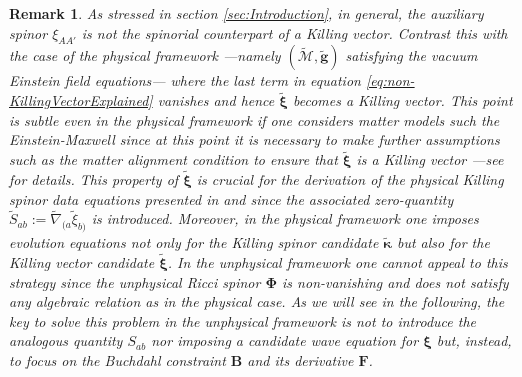 \documentclass[10pt,a4paper]{article}
\theoremstyle{plain}
\newtheorem{remark}{Remark}
\def\bmg{{\bm g}}
\def\bmB{{\bm B}}
\def\bmF{{\bm F}}
\begin{document}
\begin{remark}
  \emph{ As stressed in section \ref{sec:Introduction}, in general,
  the auxiliary spinor $\xi_{AA'}$ is not the spinorial counterpart of
  a Killing vector.  Contrast this with the case of the physical
  framework ---namely $(\tilde{\mathcal{M}},\tilde{\bmg})$ satisfying
  the vacuum Einstein field equations--- where the last term in
  equation \eqref{eq:non-KillingVectorExplained} vanishes and hence
  $\tilde{\bm\xi}$ becomes a Killing vector. This point is subtle even
  in the physical framework if one considers matter models such the
  Einstein-Maxwell since at this point it is necessary to make further assumptions
  such as the matter alignment condition to ensure that $\tilde{\bm\xi}$ is a
  Killing vector ---see \cite{ValCol16} for details. This property of
  $\tilde{\bm\xi}$ is crucial for the derivation of the physical
  Killing spinor data equations presented in \cite{GarVal08c} and
  \cite{ValCol16} since the associated zero-quantity $\tilde{S}_{ab}:=
  \tilde{\nabla}_{(a}\tilde{\xi}_{b)}$ is introduced. Moreover, in the
  physical framework one imposes evolution equations not only for the
  Killing spinor candidate $\tilde{\bm\kappa}$ but also for the
  Killing vector candidate $\tilde{\bm\xi}$.  In the unphysical
  framework one cannot appeal to this strategy since the unphysical
  Ricci spinor $\bm\Phi$ is non-vanishing and does not satisfy any
  algebraic relation as in the physical case.
  As we will see in
  the following, the key to solve this problem in the unphysical
  framework is not to introduce the analogous quantity $S_{ab}$ nor
  imposing a candidate wave equation for $\bm\xi$ but, instead, to
  focus on the Buchdahl constraint $\bmB$ and its derivative $\bmF$.
  }
\end{remark}
\end{document}
